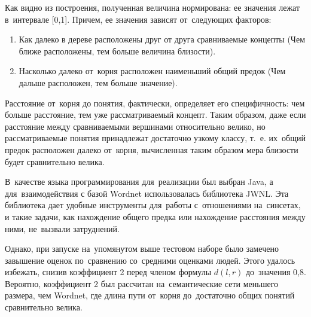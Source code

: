 Как видно из построения, полученная величина нормирована: ее значения лежат в~интервале [0,1].
Причем, ее значения зависят от~следующих факторов:

\begin{enumerate}

\item{
Как далеко в дереве расположены друг от друга сравниваемые концепты (Чем ближе расположены, тем больше величина близости).
}

\item{
Насколько далеко от~корня расположен наименьший общий предок   (Чем дальше расположен, тем больше значение).
}

\end{enumerate}

Расстояние от~корня до понятия, фактически, определяет его специфичность:
чем больше расстояние, тем уже рассматриваемый концепт.
Таким образом, даже если расстояние между сравниваемыми вершинами относительно велико, 
но рассматриваемые понятия принадлежат достаточно узкому классу, 
т.~е. их~общий предок расположен далеко от~корня,
вычисленная таким образом мера близости будет сравнительно велика.

В~качестве языка программирования для~реализации был выбран Java,
а для~взаимодействия с базой Wordnet использовалась библиотека JWNL\cite{jwnl}.
Эта библиотека дает удобные инструменты для~работы с~отношениями на~синсетах,
и такие задачи, как нахождение общего предка или нахождение расстояния между ними, не~вызвали затруднений.

Однако, при запуске на~упомянутом выше тестовом наборе 
было замечено завышение оценок по~сравнению со~средними оценками людей.
Этого удалось избежать, снизив коэффициент 2 перед членом формулы $d(l,r)$ до~значения 0,8. 
Вероятно, коэффициент 2 был рассчитан на~семантические сети меньшего размера,  чем Wordnet, 
где длина пути от~корня до~достаточно общих понятий сравнительно велика.

